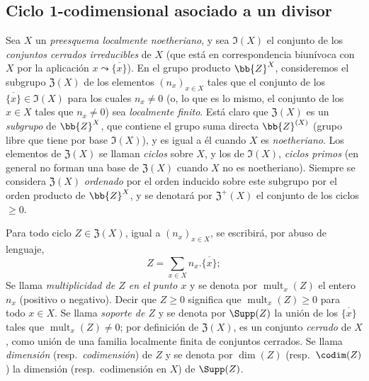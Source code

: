 \subsection{Ciclo 1-codimensional asociado a un divisor}
\label{subsection:IV.21.6}
\label{IV.21.6}

\begin{env}[21.6.1]
\label{IV.21.6.1}
Sea $X$ un \emph{preesquema localmente noetheriano}, y sea $\mathfrak{I}(X)$ el conjunto de los \emph{conjuntos cerrados irreducibles} de $X$ (que está en correspondencia biunívoca con $X$ por la aplicación $x\leadsto\overline{\{x\}}$).
En el grupo producto $\bb{Z}^X$, consideremos el subgrupo $\mathfrak{Z}(X)$ de los elementos $(n_x)_{x\in X}$ tales que el conjunto de los $\overline{\{x\}}\in\mathfrak{I}(X)$ para los cuales $n_x\neq0$ (o, lo que es lo mismo, el conjunto de los $x\in X$ tales que $n_x\neq0$) sea \emph{localmente finito}.
Está claro que $\mathfrak{Z}(X)$ es un \emph{subgrupo} de $\bb{Z}^X$, que contiene el grupo suma directa $\bb{Z}^{(X)}$ (grupo libre que tiene por base $\mathfrak{I}(X)$), y es igual a él cuando $X$ es \emph{noetheriano}.
Los elementos de $\mathfrak{Z}(X)$ se llaman \emph{ciclos} sobre $X$, y los de $\mathfrak{I}(X)$, \emph{ciclos primos} (en general no forman una base de $\mathfrak{Z}(X)$ cuando $X$ no es noetheriano).
Siempre se considera $\mathfrak{Z}(X)$ \emph{ordenado} por el orden inducido sobre este subgrupo por el orden producto de $\bb{Z}^X$, y se denotará por $\mathfrak{Z}^+(X)$ el conjunto de los ciclos $\geq0$.


Para todo ciclo $Z\in\mathfrak{Z}(X)$, igual a $(n_x)_{x\in X}$, se escribirá, por abuso de lenguaje,
\[
  Z=\sum_{x\in X}n_x.\overline{\{x\}};
\]
Se llama \emph{multiplicidad de $Z$ en el punto $x$} y se denota por $\operatorname{mult}_x(Z)$ el entero $n_x$ (positivo o negativo).
Decir que $Z\geq0$ significa que $\operatorname{mult}_x(Z)\geq0$ para todo $x\in X$.
Se llama \emph{soporte de $Z$} y se denota por $\Supp(Z)$ la unión de los $\overline{\{x\}}$ tales que $\operatorname{mult}_x(Z)\neq0$;
por definición de $\mathfrak{Z}(X)$, es un conjunto \emph{cerrado} de $X$, como unión de una familia localmente finita de conjuntos cerrados.
Se llama \emph{dimensión} (resp.\ \emph{codimensión}) de $Z$ y se denota por $\dim(Z)$ (resp.\ $\codim(Z)$) la dimensión (resp.\ codimensión en $X$) de $\Supp(Z)$.
\end{env}

